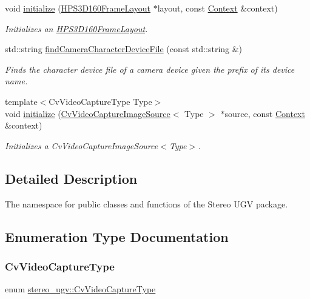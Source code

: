 \begin{DoxyCompactItemize}
void \hyperlink{namespacestereo__ugv_ac02cc03581ba53b911a9a7bd87f9a24c}{initialize} (\hyperlink{classstereo__ugv_1_1HPS3D160FrameLayout}{H\+P\+S3\+D160\+Frame\+Layout} $\ast$layout, const \hyperlink{classstereo__ugv_1_1Context}{Context} \&context)
\begin{DoxyCompactList}\small\item\em Initializes an \hyperlink{classstereo__ugv_1_1HPS3D160FrameLayout}{H\+P\+S3\+D160\+Frame\+Layout}. \end{DoxyCompactList}\item 
std\+::string \hyperlink{namespacestereo__ugv_af45c67058883fb26e2c27945af6ab490}{find\+Camera\+Character\+Device\+File} (const std\+::string \&)
\begin{DoxyCompactList}\small\item\em Finds the character device file of a camera device given the prefix of its device name. \end{DoxyCompactList}\item 
{\footnotesize template$<$Cv\+Video\+Capture\+Type Type$>$ }\\void \hyperlink{namespacestereo__ugv_acaec0936792769b5d676773f7d4070cd}{initialize} (\hyperlink{classstereo__ugv_1_1CvVideoCaptureImageSource}{Cv\+Video\+Capture\+Image\+Source}$<$ Type $>$ $\ast$source, const \hyperlink{classstereo__ugv_1_1Context}{Context} \&context)
\begin{DoxyCompactList}\small\item\em Initializes a Cv\+Video\+Capture\+Image\+Source$<$\+Type$>$. \end{DoxyCompactList}\end{DoxyCompactItemize}


\subsection{Detailed Description}
The namespace for public classes and functions of the Stereo U\+GV package. 

\subsection{Enumeration Type Documentation}
\mbox{\label{namespacestereo__ugv_a5c139e7cfac12e9270ca903f1ce2e4bc}} 
\subsubsection{\texorpdfstring{Cv\+Video\+Capture\+Type}{CvVideoCaptureType}}
{\footnotesize\ttfamily enum \hyperlink{namespacestereo__ugv_a5c139e7cfac12e9270ca903f1ce2e4bc}{stereo\+\_\+ugv\+::\+Cv\+Video\+Capture\+Type}\hspace{0.3cm}{\ttfamily [strong]}}



